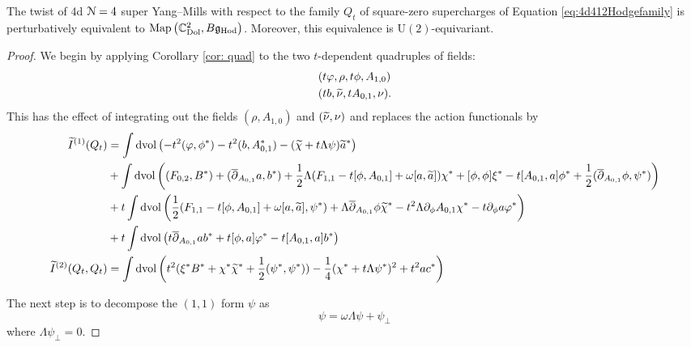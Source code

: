 \documentclass[10pt, oneside]{article}
\newcommand{\Hod}{\mathrm{Hod}}
\renewcommand{\U}{\mathrm{U}}
\begin{document}
\begin{theorem}
The twist of 4d $\cN=4$ super Yang--Mills with respect to the family $Q_t$ of square-zero supercharges of Equation \ref{eq:4d412Hodgefamily} is perturbatively equivalent to $\map\left(\CC^2_{\rm Dol}, B\fg_{\Hod}\right)$. Moreover, this equivalence is $\U(2)$-equivariant.
\label{thm:4d12hodge}
\end{theorem}

\begin{proof}
We begin by applying Corollary \ref{cor: quad} to the two $t$-dependent quadruples of fields:
\begin{align*}
& (t \varphi, \rho, t \phi, A_{1,0}) \\
& (tb, \Tilde{\nu}, t A_{0,1}, \nu) .
\end{align*}
This has the effect of integrating out the fields $(\rho, A_{1,0})$ and $(\Tilde{\nu}, \nu)$ and replaces the action functionals by
\begin{align*}
\Tilde{I}^{(1)}(Q_t) &= \int \dvol\left(- t^2 (\varphi, \phi^*) - t^2 (b, A_{0, 1}^*) - (\wt \chi + t\Lambda\psi) \wt a^*\right) \\
&+ \int\dvol\left((F_{0, 2}, B^*) + (\ol\dd_{A_{0, 1}}a, b^*) + \frac{1}{2}\Lambda(F_{1, 1} - t [\phi, A_{0,1}] + \omega [a, \wt a])\chi^* + [\phi, \phi]\xi^* - t [A_{0,1}, a] \phi^* + \frac{1}{2} (\dbar_{A_{0,1}} \phi, \psi^*)\right) \\
&+t\int\dvol\left(\frac{1}{2} (F_{1,1} -t [\phi, A_{0,1}] + \omega [a, \wt a], \psi^*) + \Lambda \ol\dd_{A_{0, 1}} \phi \wt\chi^* - t^2 \Lambda \partial_{\phi} A_{0,1} \chi^* - t \partial_\phi a \varphi^* \right) \\ & + t \int \dvol \left( t \dbar_{A_{0,1}} a b^* + t [\phi, a] \varphi^* - t [A_{0,1}, a]b^* \right) \\
\Tilde{I}^{(2)} (Q_t, Q_t) &= \int \dvol \left(t^2(\xi^*B^* + \chi^*\wt\chi^* + \frac{1}{2}(\psi^*, \psi^*)) -\frac{1}{4}(\chi^* + t \Lambda\psi^*)^2 + t^2 ac^*\right)
\end{align*}

The next step is to decompose the $(1,1)$ form $\psi$ as
\[
\psi = \omega \Lambda \psi + \psi_{\perp}
\]
where $\Lambda \psi_{\perp} = 0$. 

\end{proof}
\end{document}
